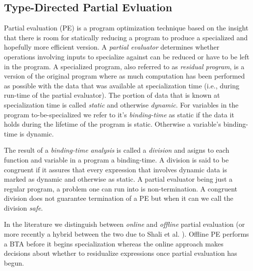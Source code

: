 \documentclass[a4paper,12pt,twoside,openright]{report}
\theoremstyle{definition}
\begin{document}
\subsection{Type-Directed Partial Evluation}
Partial evaluation (PE) is a program optimization technique based on the insight that there is room for statically reducing a program to produce a specialized and hopefully more efficient version. A \textit{partial evaluator} determines whether operations involving inputs to specialize against can be reduced or have to be left in the program. A specialized program, also referred to as \textit{residual program}, is a version of the original program where as much computation has been performed as possible with the data that was available at specialization time (i.e., during run-time of the partial evaluator). The portion of data that is known at specialization time is called \textit{static} and otherwise \textit{dynamic}. For variables in the program to-be-specialized we refer to it's \textit{binding-time} as static if the data it holds during the lifetime of the program is static. Otherwise a variable's binding-time is dynamic.

The result of a \textit{binding-time analysis} is called a \textit{division} and asigns to each function and variable in a program a binding-time. A division is said to be congruent if it assures that every expression that involves dynamic data is marked as dynamic and otherwise as static. A partial evaluator being just a regular program, a problem one can run into is non-termination. A congruent division does not guarantee termination of a PE but when it can we call the division \textit{safe}.



In the literature we distinguish between \textit{online} and \textit{offline} \cite{jones1993partial} partial evaluation (or more recently a hybrid between the two due to Shali et al. \cite{shali2011hybrid}). Offline PE performs a BTA before it begins specialization whereas the online approach makes decisions about whether to residualize expressions once partial evaluation has begun.
\end{document}
